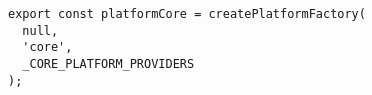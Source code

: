 \begin{verbatim}
export const platformCore = createPlatformFactory(
  null,
  'core',
  _CORE_PLATFORM_PROVIDERS
);
\end{verbatim}
